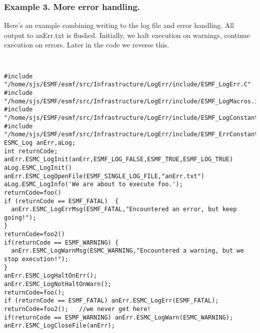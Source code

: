 \subsubsection{Example 3. More error handling. }

Here's an example combining writing to the log file and error handling.
All output to anErr.txt is flushed.  Initially, we halt execution on warnings, continue
execution on errors.  Later in the code we reverse this.

{\tt
\begin{verbatim}
#include "/home/sjs/ESMF/esmf/src/Infrastructure/LogErr/include/ESMF_LogErr.C"
#include "/home/sjs/ESMF/esmf/src/Infrastructure/LogErr/include/ESMF_LogMacros.inc"
#include "/home/sjs/ESMF/esmf/src/Infrastructure/LogErr/include/ESMF_LogConstants.inc"
#include "/home/sjs/ESMF/esmf/src/Infrastructure/LogErr/include/ESMF_ErrConstants.inc"
ESMC_Log anErr,aLog;
int returnCode; 
anErr.ESMC_LogInit(anErr,ESMF_LOG_FALSE,ESMF_TRUE,ESMF_LOG_TRUE)
aLog.ESMC_LogInit()
anErr.ESMC_LogOpenFile(ESMF_SINGLE_LOG_FILE,"anErr.txt")
aLog.ESMC_LogInfo('We are about to execute foo.');
returnCode=foo()
if (returnCode == ESMF_FATAL)  {
  anErr.ESMC_LogErrMsg(ESMF_FATAL,"Encountered an error, but keep going!");
}
returnCode=foo2()
if(returnCode == ESMF_WARNING) {
  anErr.ESMC_LogWarnMsg(ESMC_WARNING,"Encountered a warning, but we stop execution!");
}
anErr.ESMC_LogHaltOnErr();
anErr.ESMC_LogNotHaltOnWarn();
returnCode=foo();
if (returnCode == ESMF_FATAL) anErr.ESMC_LogErr(ESMF_FATAL);
returnCode=foo2();   //we never get here!
if(returnCode == ESMF_WARNING) anErr.ESMC_LogWarn(ESMC_WARNING);
anErr.ESMC_LogCloseFile(anErr);
\end{verbatim}
}\tt


